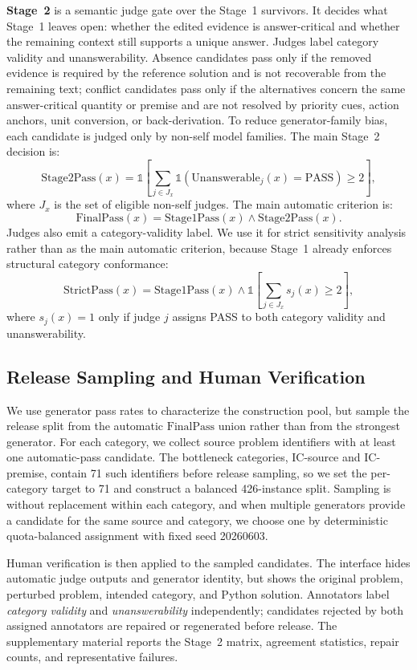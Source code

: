 \documentclass[sigconf,review]{acmart}
\begin{document}
\textbf{Stage~2} is a semantic judge gate over the Stage~1 survivors. It decides what Stage~1 leaves open: whether the edited evidence is answer-critical and whether the remaining context still supports a unique answer. Judges label category validity and unanswerability. Absence candidates pass only if the removed evidence is required by the reference solution and is not recoverable from the remaining text; conflict candidates pass only if the alternatives concern the same answer-critical quantity or premise and are not resolved by priority cues, action anchors, unit conversion, or back-derivation. To reduce generator-family bias, each candidate is judged only by non-self model families. The main Stage~2 decision is:
\[
  \mathrm{Stage2Pass}(x)=
  \mathbb{1}\left[\sum_{j \in J_x}
  \mathbb{1}(\mathrm{Unanswerable}_j(x)=\mathrm{PASS}) \ge 2\right],
\]
where $J_x$ is the set of eligible non-self judges. The main automatic criterion is:
\[
  \mathrm{FinalPass}(x)=\mathrm{Stage1Pass}(x) \land \mathrm{Stage2Pass}(x).
\]
Judges also emit a category-validity label. We use it for strict sensitivity analysis rather than as the main automatic criterion, because Stage~1 already enforces structural category conformance:
\[
  \mathrm{StrictPass}(x)=
  \mathrm{Stage1Pass}(x) \land
  \mathbb{1}\left[\sum_{j \in J_x}s_j(x)\ge2\right],
\]
where $s_j(x)=1$ only if judge $j$ assigns PASS to both category validity and unanswerability.

\subsection{Release Sampling and Human Verification}

We use generator pass rates to characterize the construction pool, but sample the release split from the automatic $\mathrm{FinalPass}$ union rather than from the strongest generator. For each category, we collect source problem identifiers with at least one automatic-pass candidate. The bottleneck categories, IC-source and IC-premise, contain 71 such identifiers before release sampling, so we set the per-category target to 71 and construct a balanced 426-instance split. Sampling is without replacement within each category, and when multiple generators provide a candidate for the same source and category, we choose one by deterministic quota-balanced assignment with fixed seed 20260603.

Human verification is then applied to the sampled candidates. The interface hides automatic judge outputs and generator identity, but shows the original problem, perturbed problem, intended category, and Python solution. Annotators label \emph{category validity} and \emph{unanswerability} independently; candidates rejected by both assigned annotators are repaired or regenerated before release. The supplementary material reports the Stage~2 matrix, agreement statistics, repair counts, and representative failures.
\end{document}

